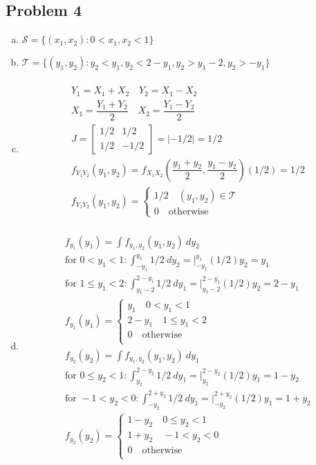 \documentclass{article}
\begin{document}
\begin{flushleft}
\section*{Problem 4}
\begin{enumerate}[(a)]
\item 
$\mathcal{S}=\{(x_1,x_2):0<x_1,x_2<1 \}$\\
\medbreak
\item 
$\mathcal{T}=\{(y_1,y_2):y_2<y_1, y_2<2-y_1, y_2>y_1-2, y_2>-y_1 \}$\\
\medbreak
\item 
\begin{multline*}\\
Y_1=X_1+X_2 \quad Y_2=X_1-X_2\\
X_1=\dfrac{Y_1+Y_2}{2} \quad X_2=\dfrac{Y_1-Y_2}{2}\\
J=\begin{bmatrix}
1/2 & 1/2\\
1/2 & -1/2
\end{bmatrix}=|-1/2|=1/2\\
f_{Y_1Y_2}(y_1,y_2)=f_{X_1X_2}(\dfrac{y_1+y_2}{2},\dfrac{y_1-y_2}{2})(1/2)=1/2\\
f_{Y_1Y_2}(y_1,y_2)=\begin{cases} 1/2 \quad (y_1,y_2)\in \mathcal{T}\\
0 \quad \text{otherwise}
\end{cases}
\end{multline*}
\item 
\begin{multline*}
\\
f_{y_1}(y_1)=\int f_{y_1,y_2}(y_1,y_2) \ dy_2\\
\text{for } 0<y_1<1: \int_{-y_1}^{y_1}1/2 \ dy_2= \bigg|_{-y_1}^{y_1}(1/2)y_2=y_1\\
\text{for } 1\leq y_1 <2: \int_{y_1-2}^{2-y_1}1/2 \ dy_1=\bigg|_{y_1-2}^{2-y_1}(1/2)y_2=2-y_1\\
f_{y_1}(y_1)=\begin{cases}
y_1 \quad 0< y_1<1\\
2-y_1 \quad 1\leq y_1< 2\\
0 \quad \text{otherwise}\\
\end{cases}\\
f_{y_2}(y_2)=\int f_{y_1,y_2}(y_1,y_2) \ dy_1\\
\text{for } 0\leq y_2<1: \int_{y_2}^{2-y_2}1/2 \ dy_1= \bigg|_{y_2}^{2-y_2}(1/2)y_1=1-y_2\\
\text{for } -1< y_2 <0: \int_{-y_2}^{2+y_2}1/2 \ dy_1=\bigg|_{-y_2}^{2+y_2}(1/2)y_1=1+y_2\\
f_{y_2}(y_2)=\begin{cases}
1-y_2 \quad 0\leq y_2<1\\
1+y_2 \quad -1< y_2< 0\\
0 \quad \text{otherwise}\\
\end{cases}\\
\end{multline*}
\end{enumerate}

\end{flushleft}
\end{document}
